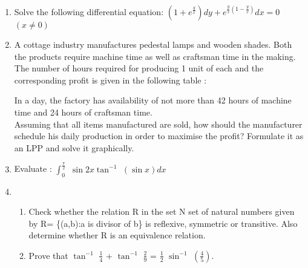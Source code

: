 \documentclass[journal,12pt,twocolumn]{IEEEtran}
\renewcommand\thesection{\arabic{section}}
\begin{document}
\begin{enumerate}[label=\thesection.\arabic*.,ref=\thesection.\theenumi]
\item Solve the following differential equation: $(1+e^{\frac{y}{x}}) dy+e^{\frac{y}{x}(1-\frac{y}{x})} dx = 0 $  $(x\not= 0)$

\item A cottage industry manufactures pedestal lamps and wooden shades. Both the products require machine time as well as craftsman time in the making. The number of hours required for producing 1 unit of each and the corresponding profit is given in the following table :
\begin{table}[htb]
\tiny
\caption{}
\end{table}
In a day, the factory has availability of not more than 42 hours of machine time and 24 hours of craftsman time.\\
Assuming that all items manufactured are sold, how should the manufacturer schedule his daily production in order to maximise the profit? Formulate it as an LPP and solve it graphically.\\

 \item Evaluate : $\int_{0}^{\frac{\pi}{2}}$ $\sin2x \tan^{-1}$  $\left(\sin x\right)dx$\\

 \item \begin{enumerate} \item Check whether the relation R in the set N set of natural numbers given by R= \{(a,b):a is divisor of b\} is reflexive, symmetric or transitive. Also determine whether R is an equivalence relation. 
    
\item Prove that $\tan^{-1}$ $\frac{1}{4}$ + $\tan^{-1}$ $\frac{2}{9}$ = $\frac{1}{2}$ $\sin^{-1}$ $(\frac{4}{5})$.\\
 \end{enumerate}


\end{enumerate}
\end{document}
